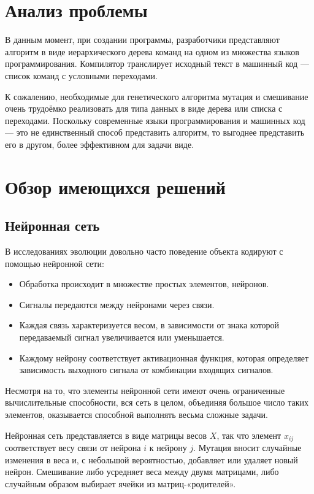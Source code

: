 \documentclass[utf8,a5paper,portrait,10pt]{eskdtext}
\begin{document}
\section{Анализ проблемы}

В данным момент, при создании программы, разработчики представляют алгоритм в
виде иерархического дерева команд на одном из множества языков программирования.
Компилятор транслирует исходный текст в машинный код — список команд с условными
переходами.

К сожалению, необходимые для генетического алгоритма мутация и смешивание очень
трудоёмко реализовать для типа данных в виде дерева или списка с переходами.
Поскольку современные языки программирования и машинных код — это не
единственный способ представить алгоритм, то выгоднее представить его в другом,
более эффективном для задачи виде.

\newpage
\section{Обзор имеющихся решений}

\subsection{Нейронная сеть}

В исследованиях эволюции\cite{communication} довольно часто поведение объекта 
кодируют с помощью нейронной сети:\cite{neural}
\begin{itemize}
  \item Обработка происходит в множестве простых элементов, нейронов.
  \item Сигналы передаются между нейронами через связи.
  \item Каждая связь характеризуется весом, в зависимости от знака которой
        передаваемый сигнал увеличивается или уменьшается.
  \item Каждому нейрону соответствует активационная функция, которая определяет 
        зависимость выходного сигнала от комбинации входящих сигналов.
\end{itemize}

Несмотря на то, что элементы нейронной сети имеют очень ограниченные
вычислительные способности, вся сеть в целом, объединяя большое число таких
элементов, оказывается способной выполнять весьма сложные задачи.

Нейронная сеть представляется в виде матрицы весов $X$, так что элемент
$x_{ij}$ соответствует весу связи от нейрона $i$ к нейрону $j$. Мутация
вносит случайные изменения в веса и, с небольшой вероятностью, добавляет или
удаляет новый нейрон. Смешивание либо усредняет веса между двумя матрицами, либо
случайным образом выбирает ячейки из матриц-«родителей».
\end{document}
